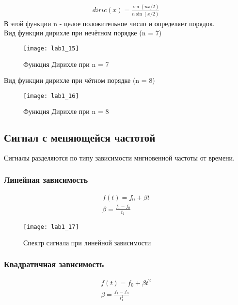 \begin{eqnarray}
diric(x) = \frac{\sin(n x/2)}{n \sin(x/2)}
\end{eqnarray}
В этой функции n - целое положительное число и определяет порядок.\\
Вид функции дирихле при нечётном порядке (n = 7)
\begin{figure}[H]
	\begin{center}
		\texttt{[image: lab1\_15]}
		\caption{Функция Дирихле при n = 7} 
		\label{pic:lab1_15} %
	\end{center}
\end{figure}
Вид функции дирихле при чётном порядке (n = 8)
\begin{figure}[H]
	\begin{center}
		\texttt{[image: lab1\_16]}
		\caption{Функция Дирихле при n = 8} 
		\label{pic:lab1_16} %
	\end{center}
\end{figure}


\subsection{Сигнал с меняющейся частотой}
Сигналы разделяются по типу зависимости мнгновенной частоты от времени.
\subsubsection{Линейная зависимость}

\begin{eqnarray}
f(t) = f_0 + \beta t \\
\beta = \frac{f_1-f_0}{t_1}
\end{eqnarray}

\begin{figure}[H]
	\begin{center}
		\texttt{[image: lab1\_17]}
		\caption{Спектр сигнала при линейной зависимости} 
		\label{pic:lab1_17} %
	\end{center}
\end{figure}


\subsubsection{Квадратичная зависимость}

\begin{eqnarray}
f(t) = f_0 + \beta t^2 \\
\beta = \frac{f_1-f_0}{t_1^2}
\end{eqnarray}

